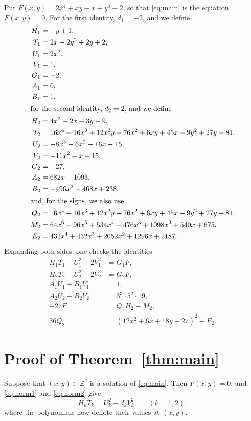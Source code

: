 \documentclass[11pt]{article}
\newcommand{\Z}{\mathbb{Z}}
\begin{document}
Put $F(x,y)=2x^{4}+xy-x+y^{3}-2$, so that \eqref{eq:main} is the equation $F(x,y)=0$.
For the first identity, $d_{1}=-2$, and we define
\begin{align*}
H_{1}&=-y+1,\\
T_{1}&=2x+2y^{2}+2y+2,\\
U_{1}&=2x^{2},\\
V_{1}&=1,\\
G_{1}&=-2,\\
A_{1}&=0,\\
B_{1}&=1,\\
\intertext{for the second identity, $d_{2}=2$, and we define}
H_{2}&=4x^{2}+2x-3y+9,\\
T_{2}&=16x^{4}+16x^{3}+12x^{2}y+76x^{2}+6xy+45x+9y^{2}+27y+81,\\
U_{2}&=-8x^{3}-6x^{2}-16x-15,\\
V_{2}&=-11x^{2}-x-15,\\
G_{2}&=-27,\\
A_{2}&=682x-1093,\\
B_{2}&=-496x^{2}+468x+238,\\
\intertext{and, for the signs, we also use}
Q_{2}&=16x^{4}+16x^{3}+12x^{2}y+76x^{2}+6xy+45x+9y^{2}+27y+81,\\
M_{2}&=64x^{6}+96x^{5}+534x^{4}+476x^{3}+1098x^{2}+540x+675,\\
E_{2}&=432x^{4}+432x^{3}+2052x^{2}+1296x+2187.
\end{align*}
Expanding both sides, one checks the identities
\begin{align}
H_{1}T_{1}-U_{1}^2+2V_{1}^2&=G_{1}F,\label{eq:norm1}\\
H_{2}T_{2}-U_{2}^2-2V_{2}^2&=G_{2}F,\label{eq:norm2}\\
A_{1}U_{1}+B_{1}V_{1}&=1,\label{eq:bez1}\\
A_{2}U_{2}+B_{2}V_{2}&=3^{3}\cdot 5^{2}\cdot 19,\label{eq:bez2}\\
-27F&=Q_{2}H_{2}-M_{2},\label{eq:sign2}\\
36Q_{2}&=(12x^{2}+6x+18y+27)^2+E_{2}.\label{eq:sign2b}
\end{align}

\section{Proof of Theorem~\ref{thm:main}}

Suppose that $(x,y)\in\Z^2$ is a solution of \eqref{eq:main}. Then $F(x,y)=0$, and \eqref{eq:norm1} and \eqref{eq:norm2} give
\begin{equation}\label{eq:HT}
H_kT_k=U_k^2+d_kV_k^2\qquad(k=1,2),
\end{equation}
where the polynomials now denote their values at $(x,y)$.
\end{document}
